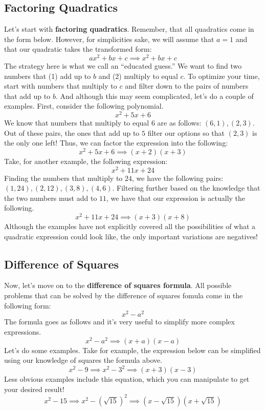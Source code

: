 \subsection{Factoring Quadratics}
Let's start with \textbf{factoring quadratics}. Remember, that all quadratics come in the form below. However, for simplicities sake, we will assume that $a = 1$ and that our quadratic takes the transformed form:
$$
ax^2 + bx + c \implies x^2 + bx + c
$$
The strategy here is what we call an ``educated guess.'' We want to find two numbers that (1) add up to $b$ and (2) multiply to equal $c$. To optimize your time, start with numbers that multiply to $c$ and filter down to the pairs of numbers that add up to $b$. And although this may seem complicated, let's do a couple of examples. First, consider the following polynomial.
$$
x^2 + 5x + 6
$$
We know that numbers that multiply to equal $6$ are as follows: $(6,1), (2,3)$. Out of these pairs, the ones that add up to $5$ filter our options so that $(2,3)$ is the only one left! Thus, we can factor the expression into the following:
$$
x^2 + 5x + 6 \implies (x+2)(x+3)
$$
Take, for another example, the following expression:
$$
x^2 + 11x + 24
$$
Finding the numbers that multiply to $24$, we have the following pairs: $(1,24),(2,12),(3,8),(4,6)$. Filtering further based on the knowledge that the two numbers must add to $11$, we have that our expression is actually the following.
$$
x^2 + 11x + 24 \implies (x+3)(x+8)
$$
Although the examples have not explicitly covered all the possibilities of what a quadratic expression could look like, the only important variations are negatives! 
\subsection{Difference of Squares}
Now, let's move on to the \textbf{difference of squares formula}. All possible problems that can be solved by the difference of squares fomula come in the following form:
$$
x^2 - a^2
$$
The formula goes as follows and it's very useful to simplify more complex expressions. 
$$
x^2 - a^2 \implies (x+a)(x-a)
$$
Let's do some examples. Take for example, the expression below can be simplified using our knowledge of squares the formula above.
$$
x^2 - 9 \implies x^2 - 3^2 \implies (x+3)(x-3)
$$
Less obvious examples include this equation, which you can manipulate to get your desired result!
$$
x^2 - 15 \implies x^2 - \left(\sqrt{15}\right)^2 \implies \left(x- \sqrt{15}\right)\left(x+\sqrt{15}\right)
$$
